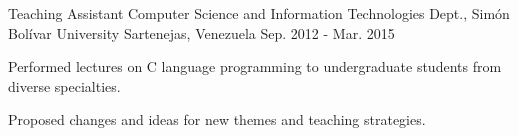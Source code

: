 \begin{cventries}
  \cventry
    {Teaching Assistant}
    {Computer Science and Information Technologies Dept., Sim\'on Bol\'ivar University}
    {Sartenejas, Venezuela}
    {Sep. 2012 - Mar. 2015}
    {
      \begin{cvitems}
        \item {Performed lectures on C language programming to undergraduate students from diverse specialties.}
        \item {Proposed changes and ideas for new themes and teaching strategies.}
      \end{cvitems}
    }
\end{cventries}
